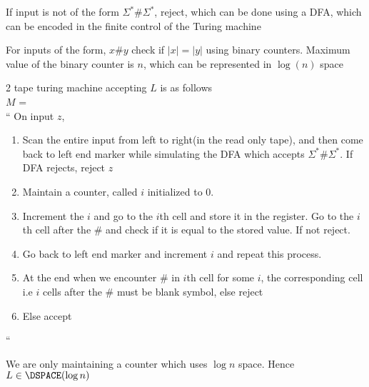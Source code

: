 If input is not of the form $\Sigma^* \# \Sigma^*$, reject, which can be done using a DFA, which can be encoded in the finite control of the Turing machine

For inputs of the form, $x \# y$ check if $|x| = |y|$ using binary counters. Maximum value of the binary counter is $n$, which can be represented in $\log(n)$ space

2 tape turing machine accepting $L$ is as follows\\
$M$ = \\
``
On input $z$,
\begin{enumerate}
    \item Scan the entire input from left to right(in the read only tape), and then come back to left end marker while simulating the DFA which accepts $\Sigma^* \# \Sigma^*$. If DFA rejects, reject $z$
    \item Maintain a counter, called $i$ initialized to 0.
    \item Increment the $i$ and go to the $i$th cell and store it in the register. Go to the $i$th cell after the \# and check if it is equal to the stored value. If not reject.
    \item Go back to left end marker and increment $i$ and repeat this process.
    \item At the end when we encounter \# in $i$th cell for some $i$, the corresponding cell i.e $i$ cells after the \# must be blank symbol, else reject
    \item Else accept
\end{enumerate}

``

We are only maintaining a counter which uses $\log{n}$ space. Hence $L \in \DSPACE(\log n)$



